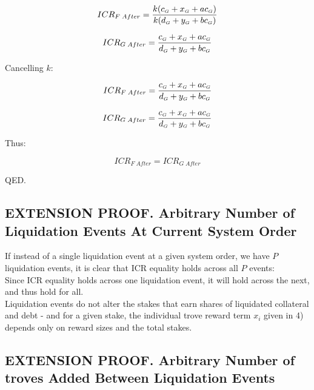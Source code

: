 \documentclass[reqno]{article}
\begin{document}
\begin{equation} 
    ICR_{F \; After}=\frac{k(c_\mathsmaller{G} + x_\mathsmaller{G}+ac_\mathsmaller{G})}{k(d_\mathsmaller{G}+y_\mathsmaller{G}+bc_\mathsmaller{G})}
\end{equation}

\begin{equation} 
    ICR_{G \; After}=\frac{c_\mathsmaller{G}+x_\mathsmaller{G}+ac_\mathsmaller{G}}{d_\mathsmaller{G}+y_\mathsmaller{G}+bc_\mathsmaller{G}}
\end{equation}

\bigskip
Cancelling $k$:

\begin{equation} 
        ICR_{F \; After}=\frac{c_\mathsmaller{G} + x_\mathsmaller{G}+ac_\mathsmaller{G}}{d_\mathsmaller{G}+y_\mathsmaller{G}+bc_\mathsmaller{G}}
\end{equation}

\begin{equation} 
    ICR_{G \; After}=\frac{c_\mathsmaller{G}+x_\mathsmaller{G}+ac_\mathsmaller{G}}{d_\mathsmaller{G}+y_\mathsmaller{G}+bc_\mathsmaller{G}}
\end{equation}

\bigskip
Thus:

\begin{equation} 
    ICR_{F \; After}=ICR_{G \; After}
\end{equation}

\bigskip
QED.

\subsection{EXTENSION PROOF. Arbitrary Number of Liquidation Events At Current System Order}

If instead of a single liquidation event at a given system order, we have $P$ liquidation events, it is clear that ICR equality holds across all $P$ events:\\

Since ICR equality holds across one liquidation event, it will hold across the next, and thus hold for all.\\

Liquidation events do not alter the stakes that earn shares of liquidated collateral and debt - and for a given stake, the individual trove reward term $x_i$ given in 4) depends only on reward sizes and the total stakes.

\subsection{EXTENSION PROOF. Arbitrary Number of troves Added Between Liquidation Events}
\end{document}
